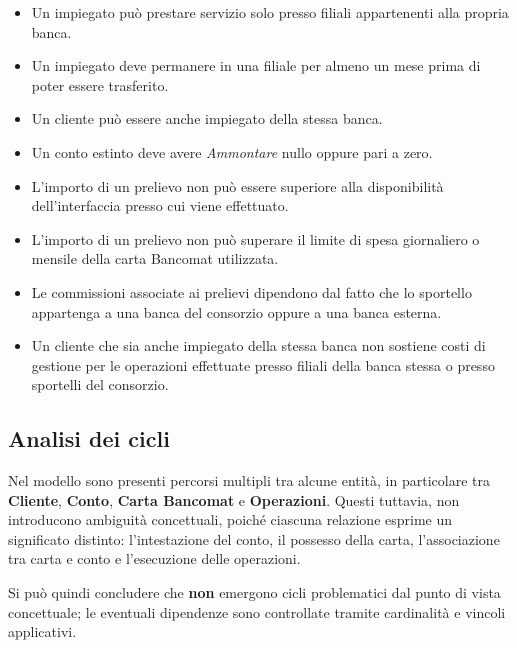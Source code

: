 \begin{itemize}
  \item Un impiegato può prestare servizio solo presso filiali appartenenti alla propria banca.
  \item Un impiegato deve permanere in una filiale per almeno un mese prima di poter essere trasferito.
  \item Un cliente può essere anche impiegato della stessa banca.
  \item Un conto estinto deve avere \textit{Ammontare} nullo oppure pari a zero.
  \item L'importo di un prelievo non può essere superiore alla disponibilità dell'interfaccia presso cui viene effettuato.
  \item L'importo di un prelievo non può superare il limite di spesa giornaliero o mensile della carta Bancomat utilizzata.
  \item Le commissioni associate ai prelievi dipendono dal fatto che lo sportello appartenga a una banca del consorzio oppure a una banca esterna.
  \item Un cliente che sia anche impiegato della stessa banca non sostiene costi di gestione per le operazioni effettuate presso filiali della banca stessa o presso sportelli del consorzio.
\end{itemize}

\subsection{Analisi dei cicli}
Nel modello sono presenti percorsi multipli tra alcune entità, in particolare tra \textbf{Cliente}, \textbf{Conto}, \textbf{Carta Bancomat} e \textbf{Operazioni}. Questi tuttavia, non introducono ambiguità concettuali, poiché ciascuna relazione esprime un significato distinto: l'intestazione del conto, il possesso della carta, l'associazione tra carta e conto e l'esecuzione delle operazioni.

Si può quindi concludere che \textbf{non} emergono cicli problematici dal punto di vista concettuale; le eventuali dipendenze sono controllate tramite cardinalità e vincoli applicativi.
